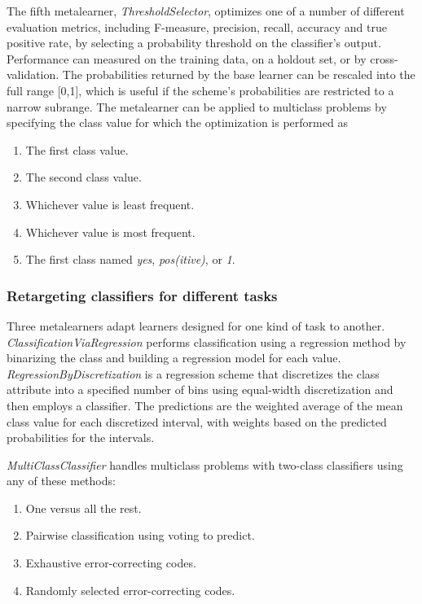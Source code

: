 The fifth metalearner, \textit{ThresholdSelector}, optimizes one of a
number of different evaluation metrics, including F-measure,
precision, recall, accuracy and true positive rate, by selecting a
probability threshold on the classifier's output. Performance can
measured on the training data, on a holdout set, or by
cross-validation. The probabilities returned by the base learner can
be rescaled into the full range [0,1], which is useful if the scheme's
probabilities are restricted to a narrow subrange. The metalearner can
be applied to multiclass problems by specifying the class value for
which the optimization is performed as

\begin{enumerate}
\item The first class value.
\item The second class value.
\item Whichever value is least frequent.
\item Whichever value is most frequent.
\item The first class named \textit{yes}, \textit{pos(itive)}, or \textit{1}.
\end{enumerate}

\subsubsection{Retargeting classifiers for different tasks}

Three metalearners adapt learners designed for one kind of task to
another. \textit{ClassificationViaRegression} performs classification
using a regression method by binarizing the class and building a
regression model for each value. \textit{RegressionByDiscretization}
is a regression scheme that discretizes the class attribute into a
specified number of bins using equal-width discretization and then
employs a classifier. The predictions are the weighted average of the
mean class value for each discretized interval, with weights based on
the predicted probabilities for the intervals.

\textit{MultiClassClassifier} handles multiclass problems with
two-class classifiers using any of these methods:

\begin{enumerate}
\item One versus all the rest.
\item Pairwise classification using voting to predict.
\item Exhaustive error-correcting codes.
\item Randomly selected error-correcting codes.
\end{enumerate}

